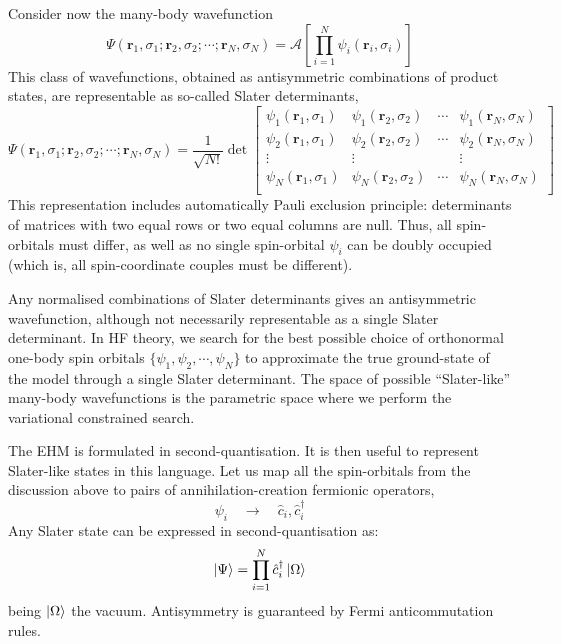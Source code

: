 Consider now the many-body wavefunction
\[
	\Psi(\mathbf{r}_1,\sigma_1;\mathbf{r}_2,\sigma_2;\cdots;\mathbf{r}_N,\sigma_N) = \mathcal{A} \left[
	\prod_{i=1}^{N} \psi_i(\mathbf{r}_i,\sigma_i)
	\right]
\]
This class of wavefunctions, obtained as antisymmetric combinations of product states, are representable as so-called Slater determinants,
\[
	\Psi(\mathbf{r}_1,\sigma_1;\mathbf{r}_2,\sigma_2;\cdots;\mathbf{r}_N,\sigma_N) = \frac{1}{\sqrt{N!}} \det \begin{bmatrix}
		\psi_1 (\mathbf{r}_1,\sigma_1) & \psi_1 (\mathbf{r}_2,\sigma_2) & \cdots & \psi_1 (\mathbf{r}_N,\sigma_N) \\
		\psi_2 (\mathbf{r}_1,\sigma_1) & \psi_2 (\mathbf{r}_2,\sigma_2) & \cdots & \psi_2 (\mathbf{r}_N,\sigma_N) \\
		\vdots & \vdots & & \vdots \\
		\psi_N (\mathbf{r}_1,\sigma_1) & \psi_N (\mathbf{r}_2,\sigma_2) & \cdots & \psi_N (\mathbf{r}_N,\sigma_N) \\
	\end{bmatrix}
\]
This representation includes automatically Pauli exclusion principle: determinants of matrices with two equal rows or two equal columns are null. Thus, all spin-orbitals must differ, as well as no single spin-orbital $\psi_i$ can be doubly occupied (which is, all spin-coordinate couples must be different).

Any normalised combinations of Slater determinants gives an antisymmetric wavefunction, although not necessarily representable as a single Slater determinant. In HF theory, we search for the best possible choice of orthonormal one-body spin orbitals $\lbrace \psi_1,\psi_2, \cdots, \psi_N \rbrace$ to approximate the true ground-state of the model through a single Slater determinant. The space of possible ``Slater-like'' many-body wavefunctions is the parametric space where we perform the variational constrained search.

The EHM is formulated in second-quantisation. It is then useful to represent Slater-like states in this language. Let us map all the spin-orbitals from the discussion above to pairs of annihilation-creation fermionic operators,
\[
	\psi_i \quad\to\quad \hat c_i, \hat c_i^\dagger
\]
Any Slater state can be expressed in second-quantisation as:
\begin{equation}\label{appeq:slater-Psi}
	\ket{\Psi} = \prod_{i=1}^N \hat c_i^\dagger \ket{\Omega}
\end{equation}
being $\ket{\Omega}$ the vacuum. Antisymmetry is guaranteed by Fermi anticommutation rules.

